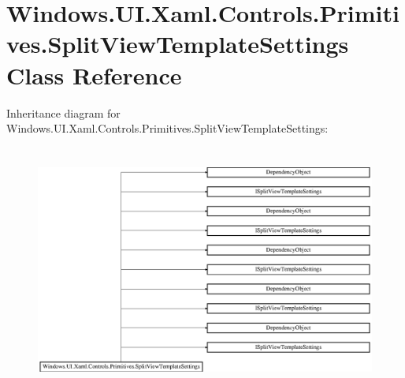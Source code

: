 \hypertarget{class_windows_1_1_u_i_1_1_xaml_1_1_controls_1_1_primitives_1_1_split_view_template_settings}{}\section{Windows.\+U\+I.\+Xaml.\+Controls.\+Primitives.\+Split\+View\+Template\+Settings Class Reference}
\label{class_windows_1_1_u_i_1_1_xaml_1_1_controls_1_1_primitives_1_1_split_view_template_settings}
Inheritance diagram for Windows.\+U\+I.\+Xaml.\+Controls.\+Primitives.\+Split\+View\+Template\+Settings\+:\begin{figure}[H]
\begin{center}
\leavevmode
\includegraphics[height=8.191490cm]{class_windows_1_1_u_i_1_1_xaml_1_1_controls_1_1_primitives_1_1_split_view_template_settings}
\end{center}
\end{figure}
